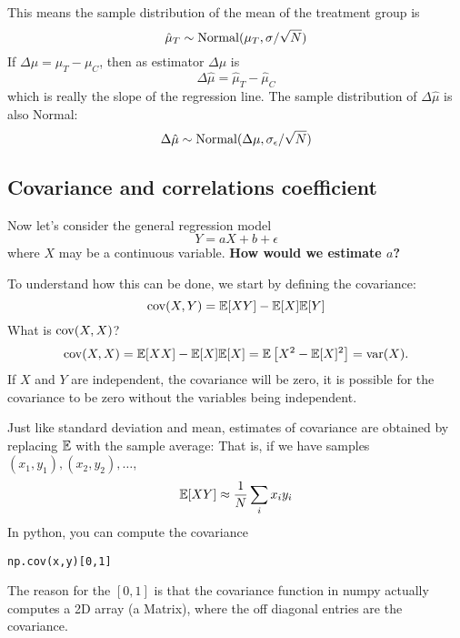 This means the sample distribution of the mean of the treatment group is
\begin{equation}
\hat{\mu}_T \sim {\rm Normal}(\mu_T,\sigma/\sqrt{N})
\end{equation}
If  $\Delta \mu = \mu_T-\mu_C$, then as estimator $\Delta \mu$ is 
\begin{equation}
\Delta \hat{\mu} =  \hat{\mu}_T-\hat{\mu}_C
\end{equation}
which is really the slope of the regression line. 
The sample distribution of $\Delta \hat{\mu}$ is also Normal:
\begin{equation}
\Delta \hat{\mu} \sim {\rm Normal}(\Delta \mu, \sigma_{\epsilon}/\sqrt{N})
\end{equation}



\subsection{Covariance and correlations coefficient}
Now let's consider the general regression model
\begin{equation}
Y = aX + b + \epsilon 
\end{equation}
where $X$ may be a continuous variable. 
{\bf How would we estimate $a$? }

 To understand how this can be done, we start by defining the covariance: 
\begin{equation}
{\rm cov}(X,Y) = \mathbb E[XY]-\mathbb E[X]\mathbb E[Y]
\end{equation}
What is ${\rm cov}(X,X)$? 
\begin{equation}
{\rm cov}(X,X) = \mathbb E[XX]-\mathbb E[X]\mathbb E[X] = \mathbb E\left[X^2 - \mathbb E[X]^2 \right] = {\rm var}(X).
\end{equation}
If $X$ and $Y$ are independent, the covariance will be zero, it is possible for the covariance to be zero without the variables being independent. 

Just like standard deviation and mean, estimates of covariance are obtained by replacing $\mathbb E$ with the sample average: That is, if we have samples $(x_1,y_1),(x_2,y_2),\dots$,
\begin{equation}
 \mathbb E[XY]  \approx \frac{1}{N}\sum_i x_iy_i
\end{equation}
In python, you can compute the covariance 
\begin{Verbatim}
np.cov(x,y)[0,1]
\end{Verbatim}
The reason for the $[0,1]$ is that the covariance function in numpy actually computes a 2D array (a Matrix), where the off diagonal entries are the covariance. 



